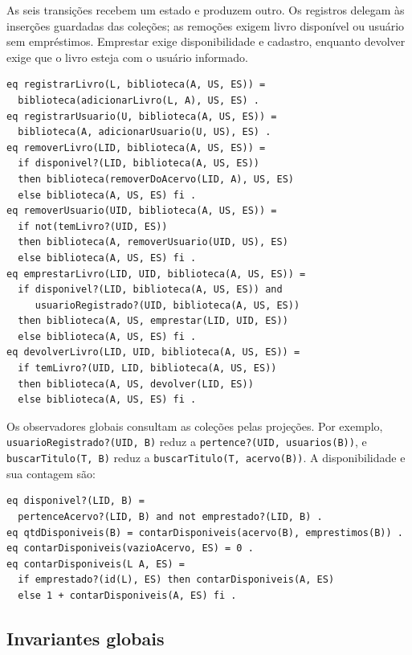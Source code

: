 \documentclass[a4paper,12pt]{article}
\begin{document}
As seis transições recebem um estado e produzem outro. Os registros delegam às
inserções guardadas das coleções; as remoções exigem livro disponível ou usuário
sem empréstimos. Emprestar exige disponibilidade e cadastro, enquanto devolver
exige que o livro esteja com o usuário informado.
\begin{lstlisting}
eq registrarLivro(L, biblioteca(A, US, ES)) =
  biblioteca(adicionarLivro(L, A), US, ES) .
eq registrarUsuario(U, biblioteca(A, US, ES)) =
  biblioteca(A, adicionarUsuario(U, US), ES) .
eq removerLivro(LID, biblioteca(A, US, ES)) =
  if disponivel?(LID, biblioteca(A, US, ES))
  then biblioteca(removerDoAcervo(LID, A), US, ES)
  else biblioteca(A, US, ES) fi .
eq removerUsuario(UID, biblioteca(A, US, ES)) =
  if not(temLivro?(UID, ES))
  then biblioteca(A, removerUsuario(UID, US), ES)
  else biblioteca(A, US, ES) fi .
eq emprestarLivro(LID, UID, biblioteca(A, US, ES)) =
  if disponivel?(LID, biblioteca(A, US, ES)) and
     usuarioRegistrado?(UID, biblioteca(A, US, ES))
  then biblioteca(A, US, emprestar(LID, UID, ES))
  else biblioteca(A, US, ES) fi .
eq devolverLivro(LID, UID, biblioteca(A, US, ES)) =
  if temLivro?(UID, LID, biblioteca(A, US, ES))
  then biblioteca(A, US, devolver(LID, ES))
  else biblioteca(A, US, ES) fi .
\end{lstlisting}

Os observadores globais consultam as coleções pelas projeções. Por exemplo,
\texttt{usuarioRegistrado?(\allowbreak{}UID,\allowbreak{} B)} reduz a
\texttt{pertence?(\allowbreak{}UID,\allowbreak{} usuarios(\allowbreak{}B))}, e \texttt{buscarTitulo(\allowbreak{}T,\allowbreak{} B)} reduz a
\texttt{buscarTitulo(\allowbreak{}T,\allowbreak{} acervo(\allowbreak{}B))}. A disponibilidade e sua contagem são:
\begin{lstlisting}
eq disponivel?(LID, B) =
  pertenceAcervo?(LID, B) and not emprestado?(LID, B) .
eq qtdDisponiveis(B) = contarDisponiveis(acervo(B), emprestimos(B)) .
eq contarDisponiveis(vazioAcervo, ES) = 0 .
eq contarDisponiveis(L A, ES) =
  if emprestado?(id(L), ES) then contarDisponiveis(A, ES)
  else 1 + contarDisponiveis(A, ES) fi .
\end{lstlisting}

\subsection{Invariantes globais}
\end{document}
